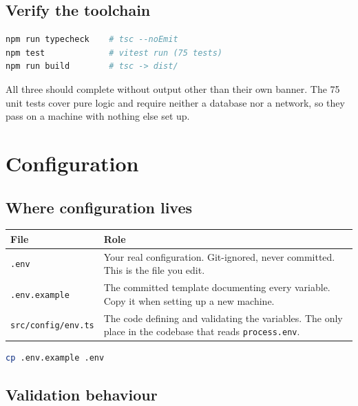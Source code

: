 \documentclass[11pt,a4paper]{report}
\begin{document}
\section{Verify the toolchain}

\begin{lstlisting}[language=bash]
npm run typecheck    # tsc --noEmit
npm test             # vitest run (75 tests)
npm run build        # tsc -> dist/
\end{lstlisting}

All three should complete without output other than their own banner. The 75
unit tests cover pure logic and require neither a database nor a network, so
they pass on a machine with nothing else set up.

\chapter{Configuration}
\label{ch:config}

\section{Where configuration lives}

\begin{center}
\begin{tabularx}{\textwidth}{@{}lX@{}}
\toprule
\textbf{File} & \textbf{Role} \\
\midrule
\texttt{.env} & Your real configuration. Git-ignored, never committed. This is
the file you edit. \\
\texttt{.env.example} & The committed template documenting every variable.
Copy it when setting up a new machine. \\
\texttt{src/config/env.ts} & The code defining and validating the variables.
The only place in the codebase that reads \texttt{process.env}. \\
\bottomrule
\end{tabularx}
\end{center}

\begin{lstlisting}[language=bash]
cp .env.example .env
\end{lstlisting}

\section{Validation behaviour}
\end{document}
